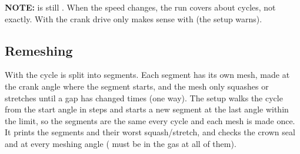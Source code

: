 \textbf{NOTE:}  is still . When the speed changes, the run covers about  cycles, not exactly. With  the crank drive only makes sense with  (the setup warns).

\subsection{Remeshing}\label{sec:remesh}
With  the cycle is split into segments. Each segment has its own mesh, made at the crank angle where the segment starts, and the mesh only squashes or stretches until a gap has changed  times (one way). The setup walks the cycle from the start angle in  steps and starts a new segment at the last angle within the limit, so the segments are the same every cycle and each mesh is made once. It prints the segments and their worst squash/stretch, and checks the crown seal and  at every meshing angle ( must be in the gas at all of them).
